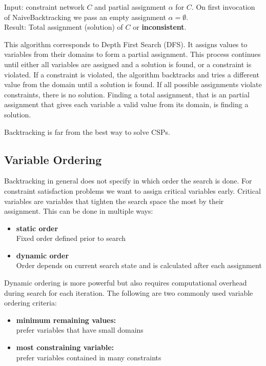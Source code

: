 Input: constraint network $C$ and partial assignment $\alpha$ for $C$. On first invocation of NaiveBacktracking we pass an empty assignment $\alpha = \emptyset$. \\
Result: Total assignment (solution) of $C$ or \textbf{inconsistent}.

This algorithm corresponds to Depth First Search (DFS). It assigns values to variables from their domains to form a partial assignment. This process continues until either all variables are assigned and a solution is found, or a constraint is violated. If a constraint is violated, the algorithm backtracks and tries a different value from the domain until a solution is found. If all possible assignments violate constraints, there is no solution. Finding a total assignment, that is an partial assignment that gives each variable a valid value from its domain, is finding a solution.

Backtracking is far from the best way to solve CSPs.

\subsection{Variable Ordering}

Backtracking in general does not specify in which order the search is done. For constraint satisfaction problems we want to assign critical variables early. Critical variables are variables that tighten the search space the most by their assignment. This can be done in multiple ways:

\begin{itemize}
	\item \textbf{static order} \\
	      Fixed order defined prior to search
	\item \textbf{dynamic order} \\
	      Order depends on current search state and is calculated after each assignment
\end{itemize}

Dynamic ordering is more powerful but also requires computational overhead during search for each iteration. The following are two commonly used variable ordering criteria:

\begin{itemize}
	\item \textbf{minimum remaining values:} \\
	      prefer variables that have small domains
	\item \textbf{most constraining variable:} \\
	      prefer variables contained in many constraints
\end{itemize}

